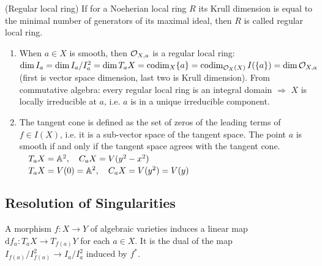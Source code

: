 \documentclass[a4paper,11pt]{article}
\begin{document}
{				\begin{defi}
					(Regular local ring) If for a Noeherian local ring $R$ its Krull dimension is equal to the minimal number of generators of its maximal ideal, then $R$ is called regular local ring.
				\end{defi}

				\begin{remark}
					\begin{enumerate}
						\item When $a\in X$ is smooth, then $\O_{X,a}$ is a regular local ring: $\dim I_a=\dim I_a/I_a^2=\dim T_aX=\codim_X\{a\}=\codim_{\O_X(X)}I(\{a\})=\dim\O_{X,a}$ (first is vector space dimension, last two is Krull dimension). From commutative algebra: every regular local ring is an integral domain $\Longrightarrow$ $X$ is locally irreducible at $a$, i.e. $a$ is in a unique irreducible component.
						\item The tangent cone is defined as the set of zeros of the leading terms of $f\in I(X)$, i.e. it is a sub-vector space of the tangent space. The point $a$ is smooth if and only if the tangent space agrees with the tangent cone.\\
						 $\quad T_aX=\AA^2,\quad C_aX=V(y^2-x^2)$\\
						 $\quad T_aX=V(0)=\AA^2, \quad C_aX=V(y^2)=V(y)$
					\end{enumerate}
				\end{remark}}


		\subsection{Resolution of Singularities}

			\noindent A  morphism $f:X\rightarrow Y$ of algebraic varieties induces a linear map $\mathrm{d}f_a:T_aX\rightarrow T_{f(a)}Y$ for each $a\in X$. It is the dual of the map $I_{f(a)}/I_{f(a)}^2\rightarrow I_a/I_a^2$ induced by $f^\ast$.
			\\
\end{document}
